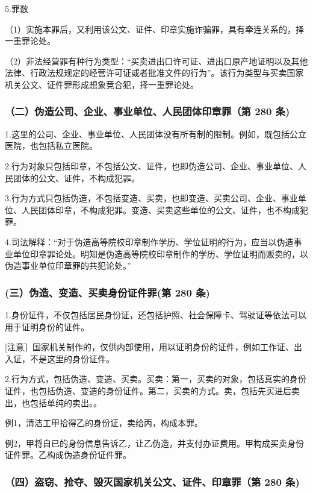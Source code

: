 5.罪数

（1）实施本罪后，又利用该公文、证件、印章实施诈骗罪，具有牵连关系的，择一重罪论处。

（2）非法经营罪有种行为类型：“买卖进出口许可证、进出口原产地证明以及其他法律、行政法规规定的经营许可证或者批准文件的行为”。该行为类型与买卖国家机关公文、证件罪形成想象竞合犯，择一重罪论处。

\subsubsection*{（二）伪造公司、企业、事业单位、人民团体印章罪（第 280 条)}

1.这里的公司、企业、事业单位、人民团体没有所有制的限制。例如，既包括公立医院，也包括私立医院。

2.行为对象只包括印章，不包括公文、证件，也即伪造公司、企业、事业单位、人民团体的公文、证件，不构成犯罪。

3.行为方式只包括伪造，不包括变造、买卖，也即变造、买卖公司、企业、事业单位、人民团体印章，不构成犯罪。变造、买卖这些单位的公文、证件，也不构成犯罪。

4.司法解释：“对于伪造高等院校印章制作学历、学位证明的行为，应当以伪造事业单位印章罪论处。明知是伪造高等院校印章制作的学历、学位证明而贩卖的，以伪造事业单位印章罪的共犯论处。”

\subsubsection*{(三）伪造、变造、买卖身份证件罪(第 280 条)}

1.身份证件，不仅包括居民身份证，还包括护照、社会保障卡、驾驶证等依法可以用于证明身份的证件。

[注意］国家机关制作的，仅供内部使用，用以证明身份的证件，例如工作证、出入证，不是这里的身份证件。

2.行为方式，包括伪造、变造、买卖。买卖：第一，买卖的对象，包括真实的身份证件，也包括伪造、变造的身份证件。第二，买卖的方式。卖，包括先买进后卖出，也包括单纯的卖出。。

例1，清洁工甲拾得乙的身份证，卖给丙，构成本罪。

例2，甲将自已的身份信息告诉乙，让乙伪造，并支付办证费用。甲构成买卖身份证件罪。乙构成伪造身份证件罪。

\subsubsection*{（四）盗窃、抢夺、毁灭国家机关公文、证件、印章罪（第 280 条)}

